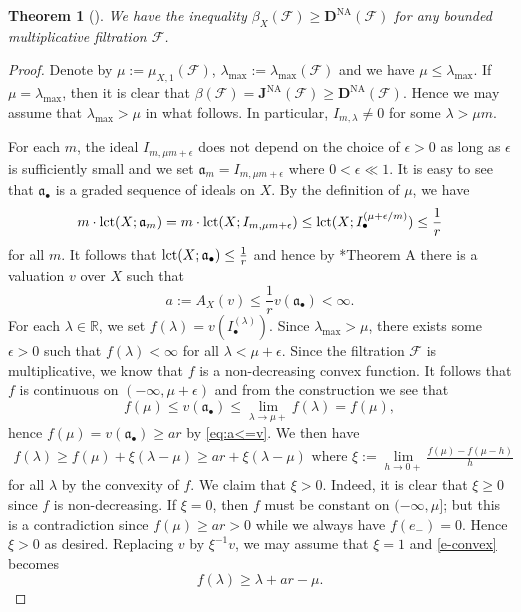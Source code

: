 \documentclass[12pt,reqno]{amsart}%
\newcommand{\bR}{{\mathbb{R} }}
\newcommand{\cF}{\mathcal{F}}
\newcommand{\DNA}{\mathbf{D}^{\mathrm{NA}}}
\newcommand{\JNA}{\mathbf{J}^{\mathrm{NA}}}
\newtheorem{thm}{Theorem}[section]
\theoremstyle{definition}
\theoremstyle{remark}
\newcommand{\fa}{{\mathfrak{a}}}
\newcommand{\lct}{{\rm lct}}
\begin{document}
\begin{thm}[{\cite[Theorem 4.3]{XZ19}}]\label{t-betading}
We have the inequality $\beta_X(\cF) \ge \DNA(\cF)$ for any bounded multiplicative filtration $\cF$.
\end{thm}
\begin{proof}
Denote by $\mu:=\mu_{X,1}(\cF)$, $\lambda_{\max}:=\lambda_{\max}(\cF)$ and we have $\mu\le \lambda_{\max}$. If $\mu=\lambda_{\max}$, then it is clear that $\beta(\cF)=\JNA(\cF)\ge \DNA(\cF)$. Hence we may assume that $\lambda_{\max}>\mu$ in what follows. In particular, $I_{m,\lambda}\neq 0$ for some $\lambda>\mu m$.

For each $m$, the ideal $I_{m,\mu m+\epsilon}$ does not depend on the choice of $\epsilon>0$ as long as $\epsilon$ is sufficiently small and we set $\fa_m=I_{m,\mu m+\epsilon}$ where $0<\epsilon\ll 1$. It is easy to see that $\fa_\bullet$ is a graded sequence of ideals on $X$. By the definition of $\mu$, we have 
\[
m\cdot \lct(X;\fa_m) = m\cdot \lct(X;I_{m,\mu m+\epsilon})\le \lct(X;I_\bullet^{(\mu+\epsilon /m)})\le \frac{1}{r}
\]
for all $m$. It follows that $\lct(X;\fa_\bullet)\le \frac{1}{r}$ and hence by \cite{JM12}*{Theorem A} there is a valuation $v$ over $X$ such that 
\begin{equation} \label{eq:a<=v}
    a:=A_{X}(v)\le \frac{1}{r}v(\fa_\bullet)<\infty.
\end{equation}
For each $\lambda\in \bR$, we set $f(\lambda)=v(I^{(\lambda)}_\bullet)$. Since $\lambda_{\max}>\mu$, there exists some $\epsilon>0$ such that $f(\lambda)<\infty$ for all $\lambda<\mu+\epsilon$. Since the filtration $\cF$ is multiplicative, we know that $f$ is a non-decreasing convex function. It follows that $f$ is continuous on $(-\infty,\mu+\epsilon)$ and from the construction we see that 
$$f(\mu)\le v(\fa_\bullet)\le \lim_{\lambda\to \mu+} f(\lambda)=f(\mu),$$ hence $f(\mu)=v(\fa_\bullet)\ge ar$ by \eqref{eq:a<=v}. We then have 
\begin{eqnarray}\label{e-convex}
f(\lambda)\ge f(\mu)+\xi (\lambda-\mu)\ge ar+\xi(\lambda-\mu) \mbox{\ \ where \ } \xi:=\lim_{h\to 0+}\frac{f(\mu)-f(\mu-h)}{h}
\end{eqnarray} 
for all $\lambda$ by the convexity of $f$. We claim that $\xi>0$. Indeed, it is clear that $\xi\ge 0$ since $f$ is non-decreasing. If $\xi=0$, then $f$ must be constant on $(-\infty,\mu]$; but this is a contradiction since $f(\mu)\ge ar>0$ while we always have $f(e_-)=0$. Hence $\xi>0$ as desired. Replacing $v$ by $\xi^{-1} v$, we may assume that $\xi=1$ and \eqref{e-convex} becomes
\begin{equation} \label{eq:f convex}
    f(\lambda)\ge \lambda +ar-\mu.
\end{equation}


\end{proof}
\end{document}
